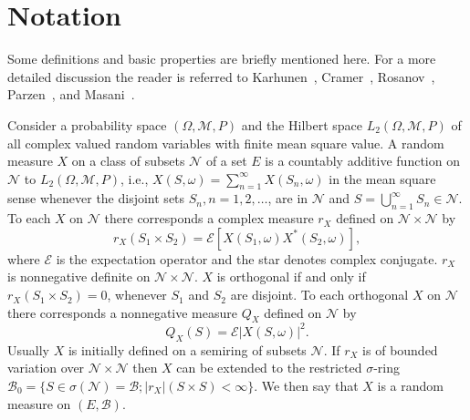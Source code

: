 \documentclass{article}
\begin{document}
\section{Notation}\label{sec:notation}

Some definitions and basic properties are briefly mentioned here. For a more
detailed discussion the reader is referred to Karhunen~{\cite{karhunen1947}},
Cramer~{\cite{cramer1951}}, Rosanov~{\cite{rosanov1959}},
Parzen~{\cite{parzen1967}}, and Masani~{\cite{masani1968}}.

Consider a probability space $(\Omega, \mathscr{M}, P)$ and the Hilbert space
$L_2 (\Omega, \mathscr{M}, P)$ of all complex valued random variables with
finite mean square value. A random measure $X$ on a class of subsets
$\mathscr{N}$ of a set $E$ is a countably additive function on $\mathscr{N}$
to $L_2 (\Omega, \mathscr{M}, P)$, i.e., $X (S, \omega) = \sum_{n =
1}^{\infty} X (S_n, \omega)$ in the mean square sense whenever the disjoint
sets $S_n, n = 1, 2, \ldots$, are in $\mathscr{N}$ and $S = \bigcup_{n =
1}^{\infty} S_n \in \mathscr{N}$. To each $X$ on $\mathscr{N}$ there
corresponds a complex measure $r_X$ defined on $\mathscr{N} \times
\mathscr{N}$ by
\begin{equation}
  r_X  (S_1 \times S_2) = \mathscr{E} [X (S_1, \omega) X^{\ast} (S_2,
  \omega)], \label{eq:rX}
\end{equation}
where $\mathscr{E}$ is the expectation operator and the star denotes complex
conjugate. $r_X$ is nonnegative definite on $\mathscr{N} \times \mathscr{N}$.
$X$ is orthogonal if and only if $r_X  (S_1 \times S_2) = 0$, whenever $S_1$
and $S_2$ are disjoint. To each orthogonal $X$ on $\mathscr{N}$ there
corresponds a nonnegative measure $Q_X$ defined on $\mathscr{N}$ by
\begin{equation}
  Q_X (S) = \mathscr{E} |X (S, \omega) |^2 . \label{eq:QX}
\end{equation}
Usually $X$ is initially defined on a semiring of subsets $\mathscr{N}$. If
$r_X$ is of bounded variation over $\mathscr{N} \times \mathscr{N}$ then $X$
can be extended to the restricted $\sigma$-ring $\mathscr{B}_0 = \{S \in
\sigma (\mathscr{N}) = \mathscr{B} ; |r_X | (S \times S) < \infty\}$. We then
say that $X$ is a random measure on $(E, \mathscr{B})$.
\end{document}
